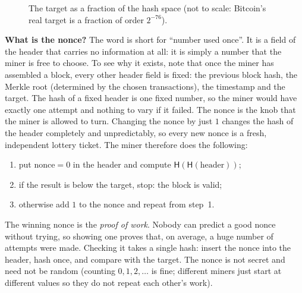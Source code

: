 \documentclass[11pt,a4paper]{article}
\theoremstyle{definition}
\theoremstyle{plain}
\theoremstyle{remark}
\newcommand{\Hash}{\mathsf{H}}
\begin{document}
\begin{figure}[htbp]
\centering
{}
\caption{The target as a fraction of the hash space (not to scale: Bitcoin's real target is a fraction of order $2^{-76}$).}
\end{figure}

\textbf{What is the nonce?} The word is short for ``number used once''. It is a field of the header that carries no information at all: it is simply a number that the miner is free to choose. To see why it exists, note that once the miner has assembled a block, every other header field is fixed: the previous block hash, the Merkle root (determined by the chosen transactions), the timestamp and the target. The hash of a fixed header is one fixed number, so the miner would have exactly one attempt and nothing to vary if it failed. The nonce is the knob that the miner is allowed to turn. Changing the nonce by just $1$ changes the hash of the header completely and unpredictably, so every new nonce is a fresh, independent lottery ticket. The miner therefore does the following:
\begin{enumerate}[nosep,leftmargin=1.5em]
\item put $\text{nonce}=0$ in the header and compute $\Hash(\Hash(\text{header}))$;
\item if the result is below the target, stop: the block is valid;
\item otherwise add $1$ to the nonce and repeat from step~1.
\end{enumerate}
The winning nonce is the \emph{proof of work}. Nobody can predict a good nonce without trying, so showing one proves that, on average, a huge number of attempts were made. Checking it takes a single hash: insert the nonce into the header, hash once, and compare with the target. The nonce is not secret and need not be random (counting $0,1,2,\dots$ is fine; different miners just start at different values so they do not repeat each other's work).
\end{document}

